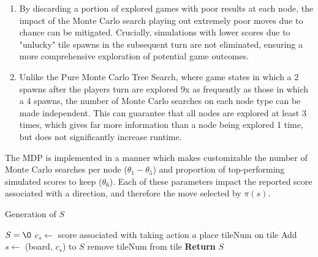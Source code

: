 \documentclass{article}
\begin{document}
\begin{enumerate}
  \item By discarding a portion of explored games with poor results at each node, the impact of the Monte Carlo search playing out extremely poor moves due to chance can be mitigated.  Crucially, simulations with lower scores due to "unlucky" tile spawns in the subsequent turn are not eliminated, ensuring a more comprehensive exploration of potential game outcomes.
  \item Unlike the Pure Monte Carlo Tree Search, where game states in which a 2 spawns after the players turn are explored 9x as frequently as those in which a 4 spawns, the number of Monte Carlo searches on each node type can be made independent.  This can guarantee that all nodes are explored at least 3 times, which gives far more information than a node being explored 1 time, but does not significantly increase runtime.  
 
\end{enumerate}

The MDP is implemented in a manner which makes customizable the number of Monte Carlo searches per node ($\theta_1 - \theta_5$) and proportion of top-performing simulated scores to keep ($\theta_6$).  Each of these parameters impact the reported score associated with a direction, and therefore the move selected by $\pi(s)$.  


\begin{algorithm}
    \caption{Generation of $S$}
    \label{CREATE_S}
    \begin{algorithmic}[1]
    		\State $S = \O$
                \State $c_s \gets$ score associated with taking action $a$
                		\State place tileNum on tile
                		\State Add $s \gets$ (board, $c_s$) to $S$
                		\State remove tileNum from tile
                	\EndFor
                \EndFor
            \EndFor
		\State \textbf{Return }$S$
        \EndFunction
    \end{algorithmic}
\end{algorithm}
\end{document}
